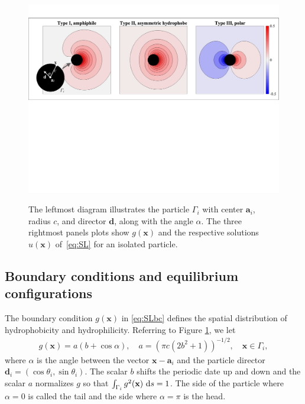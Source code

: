 \documentclass[prb,preprint,showpacs,preprintnumbers,amsmath,amssymb,longbibliography]{revtex4-2}
\renewcommand{\aa}{\mathbf{a}}
\newcommand{\dd}{\mathbf{d}}
\newcommand{\xx}{\mathbf{x}}
\begin{document}
\begin{figure}[t!]
\begin{center}
  \includegraphics[width=\textwidth]{Figures/Figure0.pdf}
\end{center}
\begin{caption}{\label{fig:boundary_conditions} The leftmost diagram
  illustrates the particle $\Gamma_i$ with center $\aa_i$, radius $c$,
  and director $\dd$, along with the angle $\alpha$.
  The three rightmost panels plots show $g(\xx)$ and
  the respective solutions $u(\xx)$ of~\eqref{eq:SL} 
  for an isolated particle.}
\end{caption}
\end{figure}

\subsection{Boundary conditions and equilibrium configurations}
The boundary condition $g(\xx)$ in \eqref{eq:SLbc} defines the spatial
distribution of hydrophobicity and hydrophilicity.  Referring to Figure
\ref{fig:boundary_conditions}, we let
\begin{align}
  \label{eq:bc-type}
g(\xx) = a(b + \cos \alpha),\quad a = (\pi c(2b^2 + 1))^{-1/2},\quad \xx \in \Gamma_i,
\end{align}
where $\alpha$ is the angle between the vector $\xx - \aa_i$ and the
particle director $\dd_i = (\cos \theta_i, \sin \theta_i)$.  The scalar
$b$ shifts the periodic date up and down and the scalar $a$ normalizes
$g$ so that $\int_{\Gamma_i} g^2(\xx) \, \dif s = 1$. The side of the
particle where $\alpha = 0$ is called the tail and the side where
$\alpha = \pi$ is the head.
\end{document}
